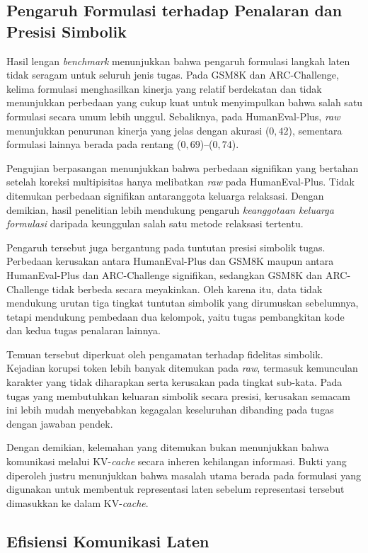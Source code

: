 \subsection{Pengaruh Formulasi terhadap Penalaran dan Presisi Simbolik}

Hasil lengan \textit{benchmark} menunjukkan bahwa pengaruh formulasi langkah
laten tidak seragam untuk seluruh jenis tugas. Pada GSM8K dan ARC-Challenge,
kelima formulasi menghasilkan kinerja yang relatif berdekatan dan tidak
menunjukkan perbedaan yang cukup kuat untuk menyimpulkan bahwa salah satu
formulasi secara umum lebih unggul. Sebaliknya, pada HumanEval-Plus,
\textit{raw} menunjukkan penurunan kinerja yang jelas dengan akurasi ($0{,}42$),
sementara formulasi lainnya berada pada rentang ($0{,}69$)--($0{,}74$).

Pengujian berpasangan menunjukkan bahwa perbedaan signifikan yang bertahan
setelah koreksi multipisitas hanya melibatkan \textit{raw} pada HumanEval-Plus.
Tidak ditemukan perbedaan signifikan antaranggota keluarga relaksasi. Dengan
demikian, hasil penelitian lebih mendukung pengaruh \textit{keanggotaan
keluarga formulasi} daripada keunggulan salah satu metode relaksasi tertentu.

Pengaruh tersebut juga bergantung pada tuntutan presisi simbolik tugas.
Perbedaan kerusakan antara HumanEval-Plus dan GSM8K maupun antara HumanEval-Plus
dan ARC-Challenge signifikan, sedangkan GSM8K dan ARC-Challenge tidak berbeda
secara meyakinkan. Oleh karena itu, data tidak mendukung urutan tiga tingkat
tuntutan simbolik yang dirumuskan sebelumnya, tetapi mendukung pembedaan dua
kelompok, yaitu tugas pembangkitan kode dan kedua tugas penalaran lainnya.

Temuan tersebut diperkuat oleh pengamatan terhadap fidelitas simbolik.
Kejadian korupsi token lebih banyak ditemukan pada \textit{raw}, termasuk
kemunculan karakter yang tidak diharapkan serta kerusakan pada tingkat
sub-kata. Pada tugas yang membutuhkan keluaran simbolik secara presisi,
kerusakan semacam ini lebih mudah menyebabkan kegagalan keseluruhan dibanding
pada tugas dengan jawaban pendek.

Dengan demikian, kelemahan yang ditemukan bukan menunjukkan bahwa komunikasi
melalui KV-\textit{cache} secara inheren kehilangan informasi. Bukti yang diperoleh
justru menunjukkan bahwa masalah utama berada pada formulasi yang digunakan
untuk membentuk representasi laten sebelum representasi tersebut dimasukkan ke
dalam KV-\textit{cache}.

\subsection{Efisiensi Komunikasi Laten}

